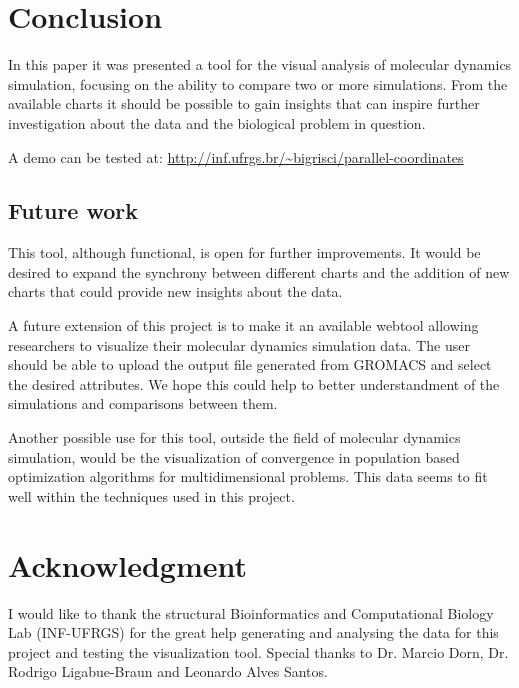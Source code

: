 \documentclass[10pt, conference]{IEEEtran}
\begin{document}

\section{Conclusion}
%

In this paper it was presented a tool for the visual analysis of molecular dynamics simulation, focusing on the ability to compare two or more simulations. From the available charts it should be possible to gain insights that can inspire further investigation about the data and the biological problem in question. 

A demo can be tested at: \url{http://inf.ufrgs.br/~bigrisci/parallel-coordinates}

\subsection{Future work}
%
This tool, although functional, is open for further improvements. It would be desired to expand the synchrony between different charts and the addition of new charts that could provide new insights about the data.

A future extension of this project is to make it an available webtool allowing researchers to visualize their molecular dynamics simulation data. The user should be able to upload the output file generated from GROMACS and select the desired attributes. We hope this could help to better understandment of the simulations and comparisons between them.

Another possible use for this tool, outside the field of molecular dynamics simulation, would be the visualization of convergence in population based optimization algorithms for multidimensional problems. This data seems to fit well within the techniques used in this project.

\iffinal
\section*{Acknowledgment}
%
I would like to thank the structural Bioinformatics and Computational Biology Lab (INF-UFRGS) for the great help generating and analysing the data for this project and testing the visualization tool. Special thanks to Dr. Marcio Dorn, Dr. Rodrigo Ligabue-Braun and Leonardo Alves Santos. 

\fi







\end{document}
